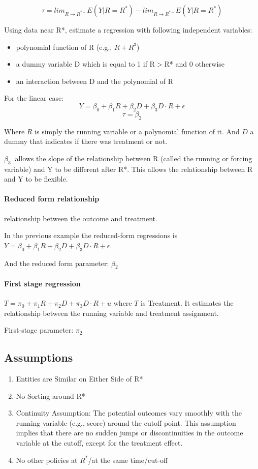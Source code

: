 \documentclass[a3paper, 8pt]{extarticle}
\begin{document}
\begin{multicols*}{5}
$$\tau=lim_{R \to R^{*+}}E(Y|R=R^*)-lim_{R \to R^{*-}}E(Y|R=R^*)$$

Using data near R*, estimate a regression with following independent variables:\begin{itemize}
    \item polynomial function of R (e.g., $R + R^3$)
    \item a dummy variable D which is equal to 1 if R$>$R* and 0 otherwise
    \item an interaction between D and the polynomial of R
\end{itemize}

For the linear case:
$$Y=\beta_0 + \beta_1 R + \beta_2 D + \beta_3 D \cdot R + \epsilon$$
$$\tau = \beta_2$$

Where $R$ is simply the running variable or a polynomial function of it. And $D$ a dummy that indicates if there was treatment or not.

$\beta_3 \ $ allows the slope of the relationship between R (called the running or forcing variable) and Y to be different after R*. This allows the relationship between R and Y to be flexible.

\paragraph{Reduced form relationship}
relationship between the outcome and treatment.

In the previous example the reduced-form regressions is $Y=\beta_0 + \beta_1 R + \beta_2 D + \beta_3 D \cdot R + \epsilon$. 

And the reduced form parameter: $\beta_2$

\paragraph{First stage regression}
$T= \pi_0 + \pi_1 R + \pi_2 D + \pi_3 D \cdot R + u $ where $T$ is Treatment. It estimates the relationship between the running variable and treatment assignment.

First-stage parameter: $\pi_2$

\subsection{Assumptions}
\begin{enumerate}
    \item Entities are Similar on Either Side of R*
    \item No Sorting around R*
    \item Continuity Assumption: The potential outcomes vary smoothly with the running variable (e.g., score) around the cutoff point. This assumption implies that there are no sudden jumps or discontinuities in the outcome variable at the cutoff, except for the treatment effect.
    \item No other policies at $R^*$/at the same time/cut-off
\end{enumerate}


\end{multicols*}
\end{document}
